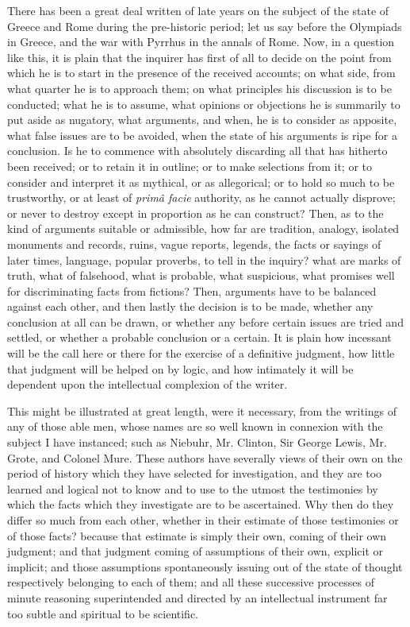 There has been a great deal written of late years on the subject of
the state of Greece and Rome during the pre-historic period; let us
say before the Olympiads in Greece, and the war with Pyrrhus in the
annals of Rome. Now, in a question like this, it is plain that the
inquirer has first of all to decide on the point from which he is to
start in the presence of the received accounts; on what side, from
what quarter he is to approach them; on what principles his discussion
is to be conducted; what he is to assume, what opinions or objections
he is summarily to put aside as nugatory, what arguments, and when, he
is to consider as apposite, what false issues are to be avoided, when
the state of his arguments is ripe for a conclusion. Is he to commence
with absolutely discarding all that has hitherto been received; or to
retain it in outline; or to make selections from it; or to consider
and interpret it as mythical, or as allegorical; or to hold so much to
be trustworthy, or at least of \emph{primâ facie} authority, as he
cannot actually disprove; or never to destroy except in proportion as
he can construct? Then, as to the kind of arguments suitable or
admissible, how far are tradition, analogy, isolated monuments and
records, ruins, vague reports, legends, the facts or sayings of later
times, language, popular proverbs, to tell in the inquiry? what are
marks of truth, what of falsehood, what is probable, what
suspicious, what promises well for discriminating facts from fictions?
Then, arguments have to be balanced against each other, and then
lastly the decision is to be made, whether any conclusion at all can
be drawn, or whether any before certain issues are tried and settled,
or whether a probable conclusion or a certain. It is plain how
incessant will be the call here or there for the exercise of a
definitive judgment, how little that judgment will be helped on by
logic, and how intimately it will be dependent upon the intellectual
complexion of the writer.

This might be illustrated at great length, were it necessary, from
the writings of any of those able men, whose names are so well known
in connexion with the subject I have instanced; such as Niebuhr, Mr.
Clinton, Sir George Lewis, Mr. Grote, and Colonel Mure. These authors
have severally views of their own on the period of history which they
have selected for investigation, and they are too learned and logical
not to know and to use to the utmost the testimonies by which the
facts which they investigate are to be ascertained. Why then do they
differ so much from each other, whether in their estimate of those
testimonies or of those facts? because that estimate is simply their
own, coming of their own judgment; and that judgment coming of
assumptions of their own, explicit or implicit; and those assumptions
spontaneously issuing out of the state of thought respectively
belonging to each of them; and all these successive processes of
minute reasoning superintended and directed by an intellectual
instrument far too subtle and spiritual to be scientific.

